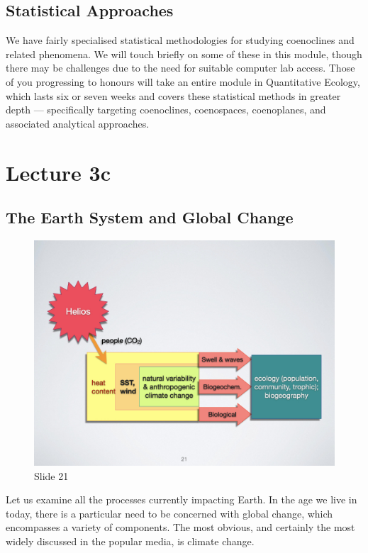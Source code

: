 \documentclass[
  12pt,
]{book}
\begin{document}
\section{Statistical Approaches}\label{statistical-approaches}

We have fairly specialised statistical methodologies for studying
coenoclines and related phenomena. We will touch briefly on some of
these in this module, though there may be challenges due to the need for
suitable computer lab access. Those of you progressing to honours will
take an entire module in Quantitative Ecology, which lasts six or seven
weeks and covers these statistical methods in greater depth ---
specifically targeting coenoclines, coenospaces, coenoplanes, and
associated analytical approaches.

\chapter*{Lecture 3c}\label{lecture-3c}

\section{The Earth System and Global
Change}\label{the-earth-system-and-global-change}

\begin{figure}[ht]
\centering
\includegraphics[width=0.8\linewidth]{../images/BDC334/BDC334-021.jpeg}
\caption*{Slide 21}
\end{figure}

Let us examine all the processes currently impacting Earth. In the age
we live in today, there is a particular need to be concerned with global
change, which encompasses a variety of components. The most obvious, and
certainly the most widely discussed in the popular media, is climate
change.
\end{document}

